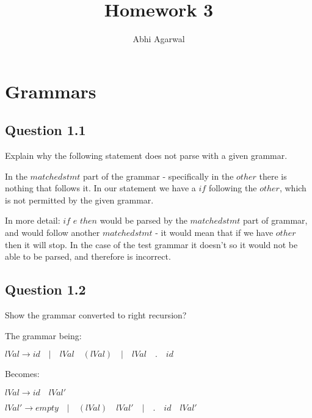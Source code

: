 \documentclass[11pt, oneside]{article}
\title{Homework 3}
\author{Abhi Agarwal}
\date{}
\begin{document}
\maketitle

\section{Grammars}
\subsection{Question 1.1}
\par Explain why the following statement does not parse with a given grammar.
\par In the $matchedstmt$ part of the grammar - specifically in the $other$ there is nothing that follows it. In our statement we have a $if$ following the $other$, which is not permitted by the given grammar.
\par In more detail: $if$ $e$ $then$ would be parsed by the $matchedstmt$ part of grammar, and would follow another $matchedstmt$ - it would mean that if we have $other$ then it will stop. In the case of the test grammar it doesn't so it would not be able to be parsed, and therefore is incorrect.

\subsection{Question 1.2}
\par Show the grammar converted to right recursion?
\par \noindent The grammar being:
\par $lVal \rightarrow id \quad | \quad lVal \quad ( lVal ) \quad | \quad lVal \quad . \quad id$
\par \noindent Becomes:
\par $lVal \rightarrow id \quad lVal'$
\par $lVal' \rightarrow empty \quad | \quad (lVal) \quad lVal' \quad | \quad . \quad id \quad lVal'$
\end{document}
